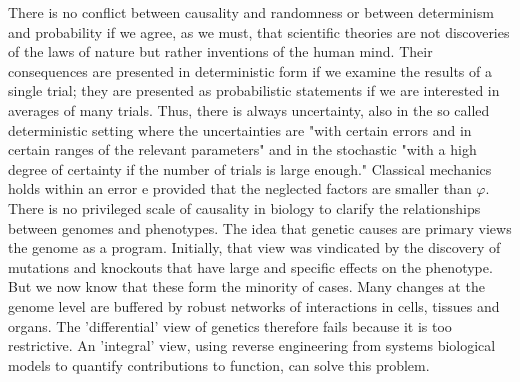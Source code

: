 \documentclass[onecollarge,runningheads]{svjour2}
\begin{document}
There is no conflict between causality and randomness or between determinism and probability if we agree, as we must, that scientific theories are not discoveries of the laws of nature but rather inventions of the human mind. Their consequences are presented in deterministic form if we examine the results of a single trial; they are presented as probabilistic statements if we are interested in averages of many trials. Thus, there is always uncertainty, also in the so called deterministic setting where the uncertainties are "with certain errors and in certain ranges of the relevant parameters" and in the stochastic "with a high degree of certainty if the number of trials is large enough." Classical mechanics holds within an error e provided that the neglected factors are smaller than $\varphi$.
There is no privileged scale of causality in biology to clarify the relationships between genomes and phenotypes.  The idea that genetic causes are primary views the genome as a program. Initially, that view was vindicated by the discovery of mutations and knockouts that have large and specific effects on the phenotype. But we now know that these form the minority of cases. Many changes at the genome level are buffered by robust networks of interactions in cells, tissues and organs.  The 'differential' view of genetics therefore fails because it is too restrictive. An 'integral' view, using reverse engineering from systems biological models to quantify contributions to function, can solve this problem. %
\end{document}
